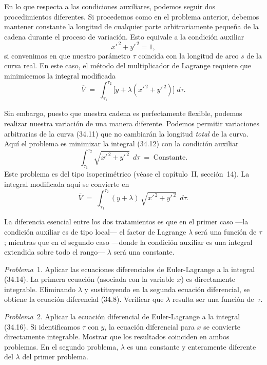 En lo que respecta a las condiciones auxiliares, podemos seguir dos procedimientos diferentes. Si procedemos como en el problema anterior, debemos mantener constante la longitud de cualquier parte arbitrariamente pequeña de la cadena durante el proceso de variación. Esto equivale a la condición auxiliar
\begin{equation}
x'^{\,2} + y'^{\,2} = 1, \tag{34.13}
\end{equation}
si convenimos en que nuestro parámetro $\tau$ coincida con la longitud de arco $s$ de la curva real. En este caso, el método del multiplicador de Lagrange requiere que minimicemos la integral modificada
\begin{equation}
\overline{V} \;=\; \int_{\tau_1}^{\tau_2} \bigl[y + \lambda(x'^{\,2} + y'^{\,2})\bigr]\;d\tau. \tag{34.14}
\end{equation}

Sin embargo, puesto que nuestra cadena es perfectamente flexible, podemos realizar nuestra variación de una manera diferente. Podemos permitir variaciones arbitrarias de la curva (34.11) que no cambiarán la longitud \emph{total} de la curva. Aquí el problema es minimizar la integral (34.12) con la condición auxiliar
\begin{equation}
\int_{\tau_1}^{\tau_2} \sqrt{x'^{\,2} + y'^{\,2}}\;\,d\tau \;=\; \text{Constante}. \tag{34.15}
\end{equation}
Este problema es del tipo isoperimétrico (véase el capítulo~II, sección~14). La integral modificada aquí se convierte en
\begin{equation}
\overline{V} \;=\; \int_{\tau_1}^{\tau_2} (y + \lambda)\,\sqrt{x'^{\,2} + y'^{\,2}}\;\,d\tau. \tag{34.16}
\end{equation}

La diferencia esencial entre los dos tratamientos es que en el primer caso ---la condición auxiliar es de tipo local--- el factor de Lagrange $\lambda$ será una función de $\tau$; mientras que en el segundo caso ---donde la condición auxiliar es una integral extendida sobre todo el rango--- $\lambda$ será una constante.

\medskip
\noindent\textit{Problema}~1. Aplicar las ecuaciones diferenciales de Euler-Lagrange a la integral (34.14). La primera ecuación (asociada con la variable $x$) es directamente integrable. Eliminando $\lambda$ y sustituyendo en la segunda ecuación diferencial, se obtiene la ecuación diferencial (34.8). Verificar que $\lambda$ resulta ser una función de~$\tau$.

\medskip
\noindent\textit{Problema}~2. Aplicar la ecuación diferencial de Euler-Lagrange a la integral (34.16). Si identificamos $\tau$ con $y$, la ecuación diferencial para $x$ se convierte directamente integrable. Mostrar que los resultados coinciden en ambos problemas. En el segundo problema, $\lambda$ es una constante y enteramente diferente del $\lambda$ del primer problema.

